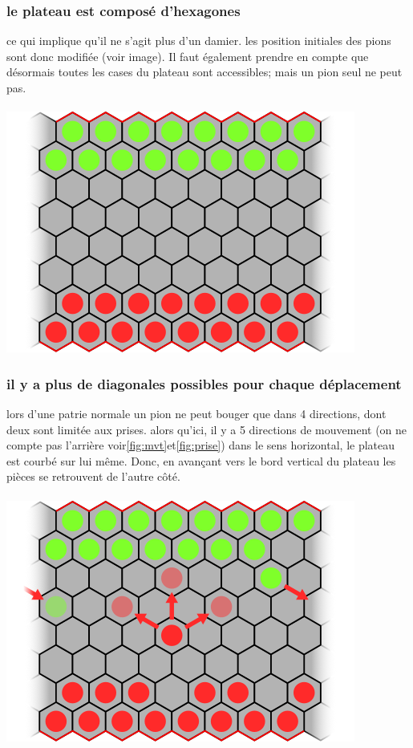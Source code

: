 \documentclass{article}
\begin{document}
\subsubsection{le plateau est composé d'hexagones}
ce qui implique qu'il ne s'agit plus d'un damier. les position initiales des pions sont donc modifiée (voir image). Il faut également prendre en compte que désormais toutes les cases du plateau sont accessibles; mais un pion seul ne peut pas.\\\\
\includegraphics[]{images/normal.png}\label{fig:normal}\\
\newpage
\subsubsection{il y a plus de diagonales possibles pour chaque déplacement}
lors d'une patrie normale un pion ne peut bouger que dans 4 directions, dont deux sont limitée aux prises. alors qu'ici, il y a 5 directions de mouvement (on ne compte pas l'arrière voir\ref{fig:mvt}et\ref{fig:prise})
dans le sens horizontal, le plateau est courbé sur lui même. Donc, en avançant vers le bord vertical du plateau les pièces se retrouvent de l'autre côté.\\\\
\includegraphics[]{images/mvt.png}\label{fig:mvt}\\
\\
\end{document}
